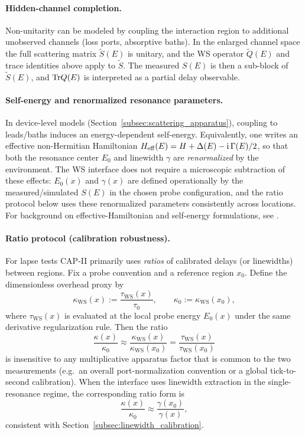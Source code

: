\paragraph{Hidden-channel completion.}
Non-unitarity can be modeled by coupling the interaction region to additional unobserved channels (loss ports, absorptive baths).
In the enlarged channel space the full scattering matrix $\widetilde S(E)$ is unitary, and the WS operator $\widetilde Q(E)$ and trace identities above apply to $\widetilde S$.
The measured $S(E)$ is then a sub-block of $\widetilde S(E)$, and $\mathrm{Tr} Q(E)$ is interpreted as a partial delay observable.

\paragraph{Self-energy and renormalized resonance parameters.}
In device-level models (Section~\ref{subsec:scattering_apparatus}), coupling to leads/baths induces an energy-dependent self-energy.
Equivalently, one writes an effective non-Hermitian Hamiltonian $H_{\mathrm{eff}}(E)=H+\Delta(E)-\mathrm{i}\,\Gamma(E)/2$, so that both the resonance center $E_0$ and linewidth $\gamma$ are \emph{renormalized} by the environment.
The WS interface does not require a microscopic subtraction of these effects: $E_0(x)$ and $\gamma(x)$ are defined operationally by the measured/simulated $S(E)$ in the chosen probe configuration, and the ratio protocol below uses these renormalized parameters consistently across locations.
For background on effective-Hamiltonian and self-energy formulations, see \cite{MahauxWeidenmueller1969,Datta1995}.

\paragraph{Ratio protocol (calibration robustness).}
For lapse tests CAP-II primarily uses \emph{ratios} of calibrated delays (or linewidths) between regions.
Fix a probe convention and a reference region $x_0$.
Define the dimensionless overhead proxy by
\begin{equation}
  \kappa_{\mathrm{WS}}(x) := \frac{\tau_{\mathrm{WS}}(x)}{\tau_0},
  \qquad
  \kappa_0 := \kappa_{\mathrm{WS}}(x_0),
\end{equation}
where $\tau_{\mathrm{WS}}(x)$ is evaluated at the local probe energy $E_0(x)$ under the same derivative regularization rule.
Then the ratio
\begin{equation}
  \frac{\kappa(x)}{\kappa_0}
  \approx
  \frac{\kappa_{\mathrm{WS}}(x)}{\kappa_{\mathrm{WS}}(x_0)}
  =
  \frac{\tau_{\mathrm{WS}}(x)}{\tau_{\mathrm{WS}}(x_0)}
  \label{eq:ws_ratio_protocol}
\end{equation}
is insensitive to any multiplicative apparatus factor that is common to the two measurements (e.g.\ an overall port-normalization convention or a global tick-to-second calibration).
When the interface uses linewidth extraction in the single-resonance regime, the corresponding ratio form is
\begin{equation}
  \frac{\kappa(x)}{\kappa_0}
  \approx
  \frac{\gamma(x_0)}{\gamma(x)},
\end{equation}
consistent with Section~\ref{subsec:linewidth_calibration}.

